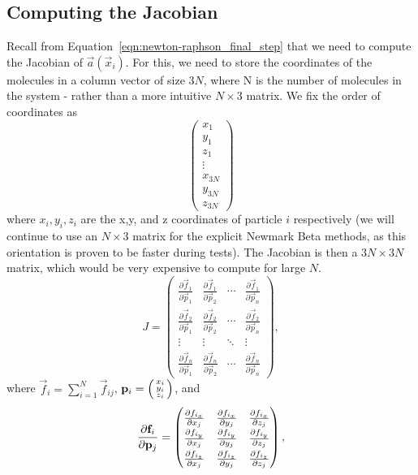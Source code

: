 \documentclass[../Main.tex]{subfiles}
\begin{document}
\newpage
\subsection{Computing the Jacobian}

Recall from Equation~\ref{eqn:newton-raphson_final_step} that we need to compute the Jacobian of $\vec{a}\left(\vec{x}_{i}\right)$. For this, we need to store the coordinates of the molecules in a column vector of size $3N$, where N is the number of molecules in the system - rather than a more intuitive $N \times 3$ matrix. We fix the order of coordinates as
$$
\begin{pmatrix}
	x_{1} \\ y_{1} \\ z_{1} \\
	\vdots \\
	x_{3N} \\ y_{3N} \\ z_{3N}
\end{pmatrix}  
$$ where $x_{i}, y_{i}, z_{i}$ are the x,y, and z coordinates of particle $i$ respectively (we will continue to use an $N \times 3$ matrix for the explicit Newmark Beta methods, as this orientation is proven to be faster during tests). The Jacobian is then a $3N \times 3N$ matrix, which would be very expensive to compute for large $N$.
$$
\renewcommand\arraystretch{1.5}
J = \begin{pmatrix}
\frac{\partial \vec{f}_{1}}{\partial \vec{p}_{1}} & \frac{\partial \vec{f}_{1}}{\partial \vec{p}_{2}} & \cdots & \frac{\partial \vec{f}_{1}}{\partial \vec{p}_{n}} \\
\frac{\partial \vec{f}_{2}}{\partial \vec{p}_{1}} & \frac{\partial \vec{f}_{2}}{\partial \vec{p}_{2}} & \cdots & \frac{\partial \vec{f}_{2}}{\partial \vec{p}_{n}} \\
\vdots & \vdots & \ddots & \vdots \\
\frac{\partial \vec{f}_{n}}{\partial \vec{p}_{1}} & \frac{\partial \vec{f}_{n}}{\partial \vec{p}_{2}} & \cdots & \frac{\partial \vec{f}_{n}}{\partial \vec{p}_{n}}
\end{pmatrix},
$$
where $\vec{f}_{i} = \sum_{i=1}^{N} \vec{f}_{ij}$, $\vec{p}_{i} = \begin{psmallmatrix} x_{i} \\ y_{i} \\ z_{i} \end{psmallmatrix}$, and \\
\begin{align}
\renewcommand\arraystretch{1.5}
\frac{\partial \vec{f}_{i}}{\partial \vec{p}_{j}} =
	\begin{pmatrix}
		\frac{\partial f_{i_{x}}}{\partial x_{j}}  & \frac{\partial f_{i_{x}}}{\partial y_{j}} & \frac{\partial f_{i_{x}}}{\partial z_{j}} \\
		\frac{\partial f_{i_{y}}}{\partial x_{j}}  & \frac{\partial f_{i_{y}}}{\partial y_{j}} & \frac{\partial f_{i_{y}}}{\partial z_{j}} \\
		\frac{\partial f_{i_{z}}}{\partial x_{j}}  & \frac{\partial f_{i_{z}}}{\partial y_{j}} & \frac{\partial f_{i_{z}}}{\partial z_{j}} 	
	\end{pmatrix}, \label{eqn:block_derivative_fi_pj}
\end{align}
\end{document}
